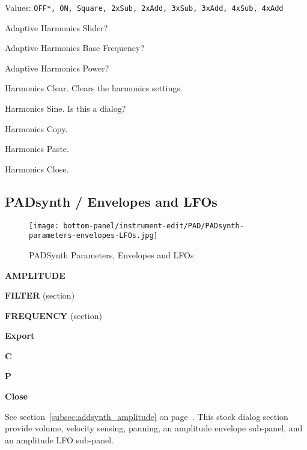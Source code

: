    Values: \texttt{OFF*, ON, Square, 2xSub, 2xAdd, 3xSub, 3xAdd, 4xSub, 4xAdd}

   Adaptive Harmonics Slider?

   Adaptive Harmonics Base Frequency?

   Adaptive Harmonics Power?

   Harmonics Clear.
   Clears the harmonics settings.

   Harmonics Sine.  Is this a dialog?

   Harmonics Copy.

   Harmonics Paste.

   Harmonics Close.

\subsection{PADsynth / Envelopes and LFOs}
\label{subsec:padsynth_envelopes_lfos}

\begin{figure}[H]
   \centering 
   \texttt{[image: bottom-panel/instrument-edit/PAD/PADsynth-parameters-envelopes-LFOs.jpg]}
   \caption{PADSynth Parameters, Envelopes and LFOs}
   \label{fig:padsynth_parameters_envelopes_and_lfos}
\end{figure}

   \begin{enumber}
      \item \textbf{AMPLITUDE}
      \item \textbf{FILTER} (section)
      \item \textbf{FREQUENCY} (section)
      \item \textbf{Export}
      \item \textbf{C}
      \item \textbf{P}
      \item \textbf{Close}
   \end{enumber}

   See section~\ref{subsec:addsynth_amplitude}
   on page~\pageref{subsec:addsynth_amplitude}.
   This stock dialog section provide volume, velocity sensing, panning, an
   amplitude envelope sub-panel, and an amplitude LFO sub-panel.

